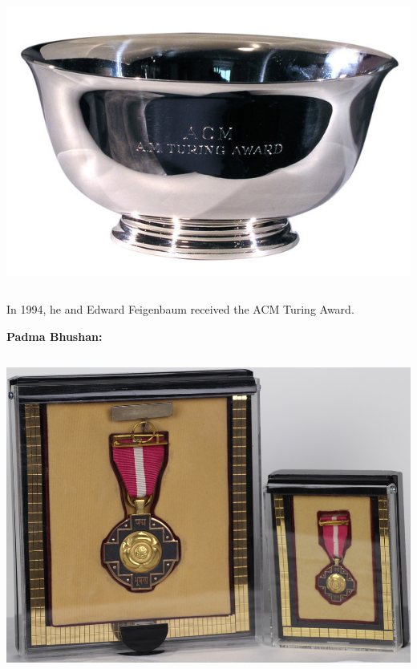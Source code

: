 \documentclass{beamer}
\begin{document}
\begin{frame}[allowframebreaks]
\begin{columns}
     \begin{column}{0.45\textwidth}
     \includegraphics[scale=0.2125]{turing_bowl.jpg}
     \end{column}
    \end{columns} 
    
     In 1994, he and Edward Feigenbaum received the ACM Turing Award.
     \framebreak
     
    {\bf Padma Bhushan:}
    \begin{columns}
     \begin{column}{0.5\textwidth}
      \begin{center}
       \includegraphics[scale=0.13]{rajpb.JPG}
      \end{center}
      \end{column}
      

\end{columns}
\end{frame}
\end{document}
